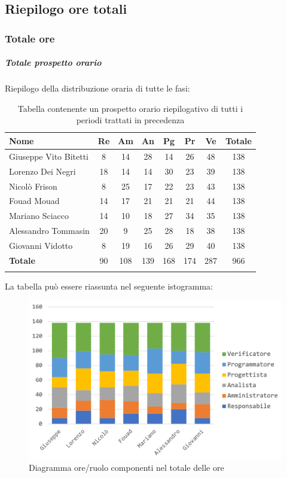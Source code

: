 	\subsection{Riepilogo ore totali}
		\subsubsection{Totale ore}
			\subparagraph{Totale prospetto orario }
			Riepilogo della distribuzione oraria di tutte le fasi:
			\begin{longtable}{|l|c|c|c|c|c|c|c|}
				\hline
				\rowcolor{lighter-grayer}
				\textbf{Nome} & \textbf{Re} & \textbf{Am} & \textbf{An} & \textbf{Pg}  & \textbf{Pr}   & \textbf{Ve} & \textbf{Totale} \\
				\hline
				\endfirsthead
				
				\hline
				Giuseppe Vito Bitetti 		& 8 & 14 & 28 & 14 & 26 & 48 & 138\\
				\hline
				\hline
				Lorenzo Dei Negri			& 18 & 14 & 14 & 30 & 23 & 39 & 138\\
				\hline
				\hline
				Nicolò Frison				    & 8 & 25 & 17 & 22 & 23 & 43 & 138\\
				\hline
				\hline
				Fouad Mouad 				 & 14 & 17 & 21 & 21 & 21 & 44 & 138\\
				\hline
				\hline
				Mariano Sciacco 			& 14 & 10 & 18 & 27 & 34 & 35 & 138\\
				\hline
				\hline
				Alessandro Tommasin    & 20 & 9 & 25 & 28 & 18 & 38 & 138\\
				\hline
				\hline
				Giovanni Vidotto 			 & 8 & 19 & 16 & 26 & 29 & 40 & 138\\
				\hline 
				\textbf{Totale}				 & 90 & 108 & 139 & 168 & 174 & 287 & 966\\
				\hline
				\caption{Tabella contenente un prospetto orario riepilogativo di tutti i periodi trattati in precedenza}
			\end{longtable}
			
			La tabella può essere riassunta nel seguente istogramma:
			\begin{figure}[H]
				\centering
				\includegraphics[width=0.8\linewidth]{./images/preventivo/totOre1.png}
				\caption{Diagramma ore/ruolo componenti nel totale delle ore}
				\label{fig:diagramma suddivione ruoli totale ore}
			\end{figure}
			\pagebreak
			
